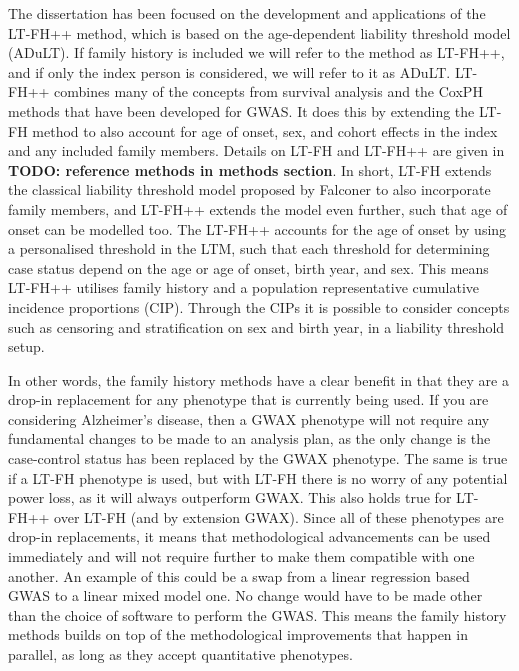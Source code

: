 The dissertation has been focused on the development and applications of the LT-FH++ method, which is based on the age-dependent liability threshold model (ADuLT). If family history is included we will refer to the method as LT-FH++, and if only the index person is considered, we will refer to it as ADuLT. LT-FH++ combines many of the concepts from survival analysis and the CoxPH methods that have been developed for GWAS. It does this by extending the LT-FH method to also account for age of onset, sex, and cohort effects in the index and any included family members. Details on LT-FH and LT-FH++ are given in \textbf{TODO: reference methods in methods section}. In short, LT-FH extends the classical liability threshold model proposed by Falconer to also incorporate family members, and LT-FH++ extends the model even further, such that age of onset can be modelled too. The LT-FH++ accounts for the age of onset by using a personalised threshold in the LTM, such that each threshold for determining case status depend on the age or age of onset, birth year, and sex. This means LT-FH++ utilises family history and a population representative cumulative incidence proportions (CIP). Through the CIPs it is possible to consider concepts such as censoring and stratification on sex and birth year, in a liability threshold setup.

In other words, the family history methods have a clear benefit in that they are a drop-in replacement for any phenotype that is currently being used. If you are considering Alzheimer's disease, then a GWAX phenotype will not require any fundamental changes to be made to an analysis plan, as the only change is the case-control status has been replaced by the GWAX phenotype. The same is true if a LT-FH phenotype is used, but with LT-FH there is no worry of any potential power loss, as it will always outperform GWAX. This also holds true for LT-FH++ over LT-FH (and by extension GWAX). Since all of these phenotypes are drop-in replacements, it means that methodological advancements can be used immediately and will not require further to make them compatible with one another. An example of this could be a swap from a linear regression based GWAS to a linear mixed model one. No change would have to be made other than the choice of software to perform the GWAS. This means the family history methods builds on top of the methodological improvements that happen in parallel, as long as they accept quantitative phenotypes.

